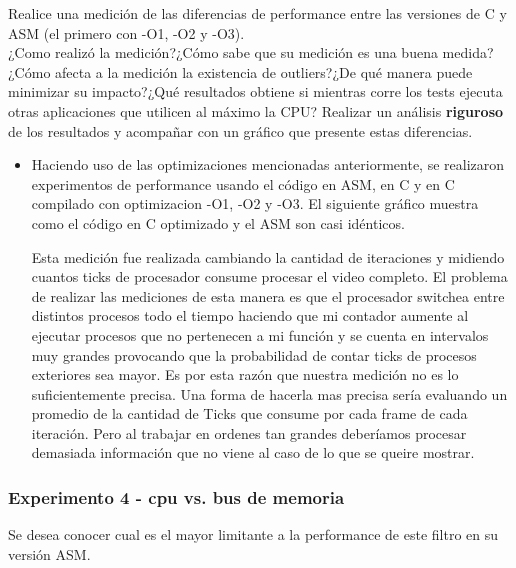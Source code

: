 	Realice una medición de las diferencias de performance entre las versiones
	de C y ASM (el primero con -O1, -O2 y -O3).\\
	¿Como realizó la medición?¿Cómo sabe que su medición es una buena medida?¿Cómo afecta a la medición la existencia de outliers?¿De qué manera puede minimizar su impacto?¿Qué resultados obtiene si mientras corre los tests ejecuta otras aplicaciones que utilicen al máximo la CPU? 
	Realizar un análisis \textbf{riguroso} de los resultados y acompañar con un gráfico que presente estas diferencias.
	\vspace*{0.3cm} \noindent
	\begin{itemize}
	 \item Haciendo uso de las optimizaciones mencionadas anteriormente, se realizaron experimentos de performance usando el c\'odigo en ASM, en C y en C 
	  compilado con optimizacion -O1, -O2 y -O3. El siguiente gr\'afico muestra como el c\'odigo en C optimizado y el ASM son casi id\'enticos.	

\begin{center}
\end{center}

Esta medici\'on fue realizada cambiando la cantidad de iteraciones y midiendo cuantos ticks de procesador consume procesar el video completo. El 
problema de realizar las mediciones de esta manera es que el procesador switchea entre distintos procesos todo el tiempo haciendo que mi contador aumente
 al ejecutar procesos que no pertenecen a mi funci\'on y se cuenta en intervalos muy grandes provocando que la probabilidad de contar ticks de procesos
 exteriores sea mayor. Es por esta raz\'on que nuestra medici\'on no es lo suficientemente precisa. Una forma de hacerla mas precisa ser\'ia evaluando un
promedio de la cantidad de Ticks que consume por cada frame de cada iteraci\'on. Pero al trabajar en ordenes tan grandes deber\'iamos procesar demasiada
 informaci\'on que no viene al caso de lo que se queire mostrar.\newline

\end{itemize}

\vspace*{0.3cm} \noindent
\subsubsection{Experimento 4 - cpu vs. bus de memoria}

	Se desea conocer cual es el mayor limitante a la performance de este filtro en su versión ASM.

